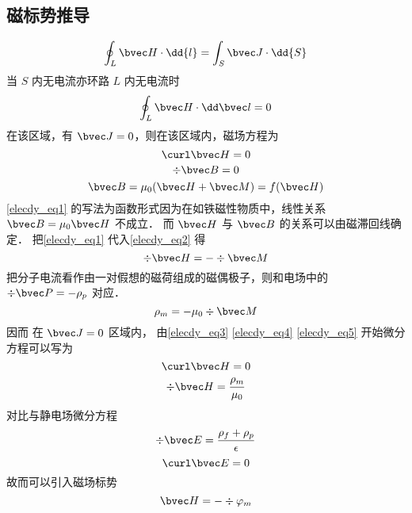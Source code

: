
\subsection{磁标势推导}
\begin{equation}
\oint_L \bvec H \cdot \dd{l} = \int_S \bvec J \cdot \dd{S}
\end{equation}
当 $S$ 内无电流亦环路 $L$ 内无电流时
\begin{equation}
\oint_ L\bvec H \cdot \dd \bvec l = 0
\end{equation}
在该区域，有 $\bvec J=0$，则在该区域内，磁场方程为 
\begin{equation}\label{elecdy_eq3}
\curl \bvec H =0
\end{equation}
\begin{equation}\label{elecdy_eq2}
\div \bvec B=0
\end{equation}
\begin{equation}\label{elecdy_eq1}
\bvec B=\mu_0(\bvec H+\bvec M)=f(\bvec H)
\end{equation}
\autoref{elecdy_eq1} 的写法为函数形式因为在如铁磁性物质中，线性关系 $\bvec B=\mu_0 \bvec H$ 不成立．
而 $\bvec H$ 与 $\bvec B$ 的关系可以由磁滞回线确定．
把\autoref{elecdy_eq1} 代入\autoref{elecdy_eq2} 得
\begin{equation}\label{elecdy_eq4}
\div \bvec H= - \div \bvec M
\end{equation}
把分子电流看作由一对假想的磁荷组成的磁偶极子，则和电场中的 $\div \bvec P=-\rho _p$ 对应．
\begin{equation}\label{elecdy_eq5}
\rho_m=-\mu_0 \div \bvec M
\end{equation}
因而 在 $\bvec J=0$ 区域内， 由\autoref{elecdy_eq3} \autoref{elecdy_eq4} \autoref{elecdy_eq5} 开始微分方程可以写为
\begin{equation}
\curl \bvec H=0 
\end{equation}
\begin{equation}
\div \bvec H= \dfrac{\rho_m}{\mu_0}
\end{equation}
对比与静电场微分方程
\begin{equation}
\div \bvec E=\dfrac{\rho_f+\rho_p}{\epsilon}
\end{equation}
\begin{equation}
\curl \bvec E=0
\end{equation}
故而可以引入磁场标势
\begin{equation}
\bvec H=-\div \varphi_m
\end{equation}
